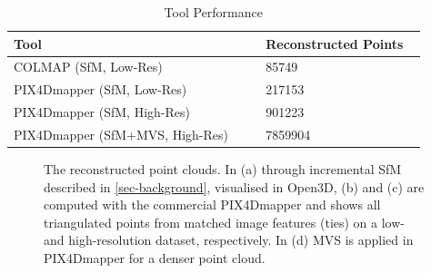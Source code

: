 \documentclass[conference,]{IEEEtran}
\begin{document}
\begin{table}
    \renewcommand{\arraystretch}{1.3}
    \caption{Tool Performance}
    \label{tab-tool_performance}
    \centering
    \begin{tabular}{|>{\raggedright}p{0.55\linewidth}|p{0.35\linewidth}|}
        \hline
        \textbf{Tool} & \textbf{Reconstructed Points} \\
        \hline
        COLMAP (SfM, Low-Res) & 85749 \\
        \hline
        PIX4Dmapper (SfM, Low-Res) & 217153 \\
        \hline
        PIX4Dmapper (SfM, High-Res) & 901223 \\
        \hline
        PIX4Dmapper (SfM+MVS, High-Res) & 7859904 \\
        \hline
    \end{tabular}
\end{table}

\begin{figure}[tp]
    \centering
    \hfil
    \hfil
    \hfil
    \caption{The reconstructed point clouds. In (a) through incremental SfM described in \cref{sec-background}, visualised in Open3D, (b) and (c) are computed with the commercial PIX4Dmapper and shows all triangulated points from matched image features (ties) on a low- and high-resolution dataset, respectively. In (d) MVS is applied in PIX4Dmapper for a denser point cloud.}
    \label{fig-pclouds}
\end{figure}
\end{document}
